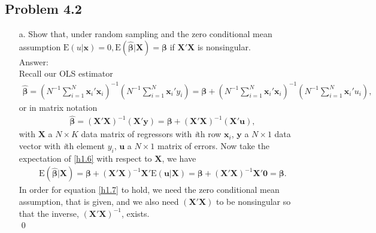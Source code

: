 \documentclass[10pt]{article}
\newcommand{\E}{\text{E}}
\begin{document}
\subsection*{Problem 4.2}
\begin{enumerate}
\item[a.] Show that, under random sampling and the zero conditional mean assumption $\E(u|\mathbf{x})=0,\E(\hat{\pmb{\beta}}|\mathbf{X})=\pmb{\beta}$ if $\mathbf{X}'\mathbf{X}$ is nonsingular.
\\ Answer:\\

Recall our OLS estimator
\begin{align*}
\hat{\pmb{\beta}}=\left(N^{-1}\sum_{i=1}^N\mathbf{x}_i'\mathbf{x}_i\right)^{-1}\left(N^{-1}\sum_{i=1}^N\mathbf{x}_i'y_i\right)=\pmb{\beta}+\left(N^{-1}\sum_{i=1}^N\mathbf{x}_i'\mathbf{x}_i\right)^{-1}\left(N^{-1}\sum_{i=1}^N\mathbf{x}_i'u_i\right),
\end{align*}
or in matrix notation
\begin{align}
\hat{\pmb{\beta}}=(\mathbf{X'X})^{-1}(\mathbf{X'y})=\pmb{\beta}+(\mathbf{X'X})^{-1}(\mathbf{X'u}), \label{h1.6}
\end{align}
with $\mathbf{X}$ a $N\times K$ data matrix of regressors with \textit{i}th row $\textbf{x}_i$, $\mathbf{y}$ a $N\times 1$ data vector with \textit{i}th element $y_i$, $\textbf{u}$ a $N\times 1$ matrix of errors. Now take the expectation of \eqref{h1.6} with respect to $\textbf{X}$, we have
\begin{align}
    \E(\hat{\pmb{\beta}}|\textbf{X})=\pmb{\beta}+(\mathbf{X'X})^{-1}\mathbf{X'}\E(\textbf{u}|\textbf{X})=\pmb{\beta}+(\mathbf{X'X})^{-1}\mathbf{X'}\textbf{0}=\pmb{\beta}. \label{h1.7}
\end{align}
In order for equation \eqref{h1.7} to hold, we need the zero conditional mean assumption, that is given, and we also need $(\mathbf{X'X})$ to be nonsingular so that the inverse, $(\mathbf{X'X})^{-1}$, exists.\\ \qed


\end{enumerate}
\end{document}
